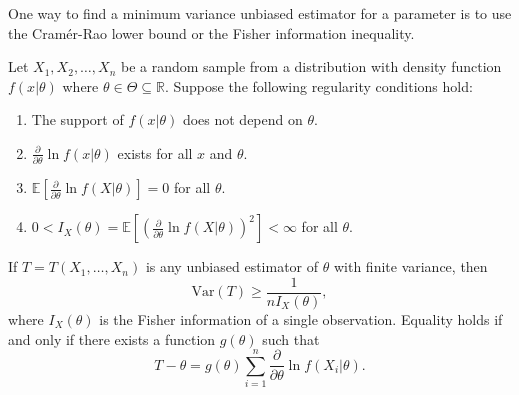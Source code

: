 One way to find a minimum variance unbiased estimator for a parameter is to use the Cramér-Rao lower bound or the Fisher 
information inequality. 

\begin{theorem}
    Let $X_1, X_2, \ldots, X_n$ be a random sample from a distribution with density function $f(x|\theta)$ where $\theta \in \Theta \subseteq \mathbb{R}$. Suppose the following regularity conditions hold:
    \begin{enumerate}
        \item The support of $f(x|\theta)$ does not depend on $\theta$.
        \item $\frac{\partial}{\partial \theta} \ln f(x|\theta)$ exists for all $x$ and $\theta$.
        \item $\mathbb{E}\left[\frac{\partial}{\partial \theta} \ln f(X|\theta)\right] = 0$ for all $\theta$.
        \item $0 < I_X(\theta) = \mathbb{E}\left[\left(\frac{\partial}{\partial \theta} \ln f(X|\theta)\right)^2\right] < \infty$ for all $\theta$.
    \end{enumerate}
    If $T = T(X_1, \ldots, X_n)$ is any unbiased estimator of $\theta$ with finite variance, then
    \[
        \text{Var}(T) \geq \frac{1}{nI_X(\theta)},
    \]
    where $I_X(\theta)$ is the Fisher information of a single observation. Equality holds if and only if there exists a function $g(\theta)$ such that
    \[
        T - \theta = g(\theta) \sum_{i=1}^n \frac{\partial}{\partial \theta} \ln f(X_i|\theta).
    \]
\end{theorem}

